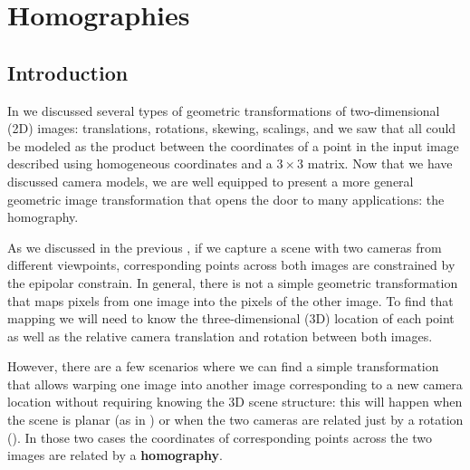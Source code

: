 \chapter{Homographies}
\label{chapter:homography}






\section{Introduction}




In \chap{\ref{chapter:geometry_homogeneous}} we discussed several types of geometric transformations of two-dimensional (2D) images: translations, rotations, skewing, scalings, and we saw that all could be modeled as the product between the coordinates of a point in the input image described using homogeneous coordinates and a $3 \times 3$ matrix.  Now that we have discussed camera models, we are well equipped to present a more general geometric image transformation that opens the door to many applications: the homography.

As we discussed in the previous \chap{\ref{chap:stereo_vision}}, if we capture a scene with two cameras from different viewpoints, corresponding points across both images are constrained by the epipolar constrain. In general, there is not a simple geometric transformation that maps pixels from one image into the pixels of the other image. To find that mapping we will need to know the three-dimensional (3D) location of each point as well as the relative camera translation and rotation between both images. %

However, there are a few scenarios where we can find a simple transformation that allows warping one image into another image corresponding to a new camera location without requiring knowing the 3D scene structure: this will happen when the scene is planar (as in \fig{\ref{fig:illustration_homography}}) or when the two cameras are related just by a rotation (\fig{\ref{fig:rotation_homography}}). In those two cases the coordinates of corresponding points across the two images are related by a {\bf homography}.


